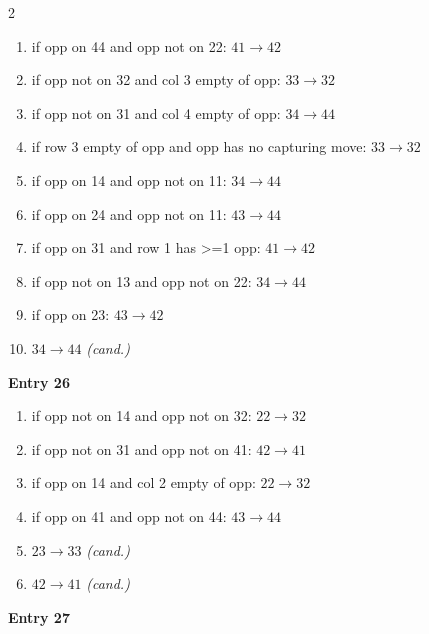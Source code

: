 \begin{multicols}{2}
\begin{tikzpicture}[scale=0.24]
\end{tikzpicture}
\nopagebreak\begin{enumerate}[topsep=1pt,itemsep=0pt,parsep=0pt,leftmargin=2.2em,label=\arabic*.]
\item if opp on 44 and opp not on 22: $41\!\to\!42$
\item if opp not on 32 and col 3 empty of opp: $33\!\to\!32$
\item if opp not on 31 and col 4 empty of opp: $34\!\to\!44$
\item if row 3 empty of opp and opp has no capturing move: $33\!\to\!32$
\item if opp on 14 and opp not on 11: $34\!\to\!44$
\item if opp on 24 and opp not on 11: $43\!\to\!44$
\item if opp on 31 and row 1 has >=1 opp: $41\!\to\!42$
\item if opp not on 13 and opp not on 22: $34\!\to\!44$
\item if opp on 23: $43\!\to\!42$
\item $34\!\to\!44$ \hfill\textit{(cand.)}
\end{enumerate}\smallskip
\noindent\textbf{Entry 26} \; 
\nopagebreak\begin{enumerate}[topsep=1pt,itemsep=0pt,parsep=0pt,leftmargin=2.2em,label=\arabic*.]
\item if opp not on 14 and opp not on 32: $22\!\to\!32$
\item if opp not on 31 and opp not on 41: $42\!\to\!41$
\item if opp on 14 and col 2 empty of opp: $22\!\to\!32$
\item if opp on 41 and opp not on 44: $43\!\to\!44$
\item $23\!\to\!33$ \hfill\textit{(cand.)}
\item $42\!\to\!41$ \hfill\textit{(cand.)}
\end{enumerate}\smallskip
\noindent\textbf{Entry 27} \; 
\end{multicols}
